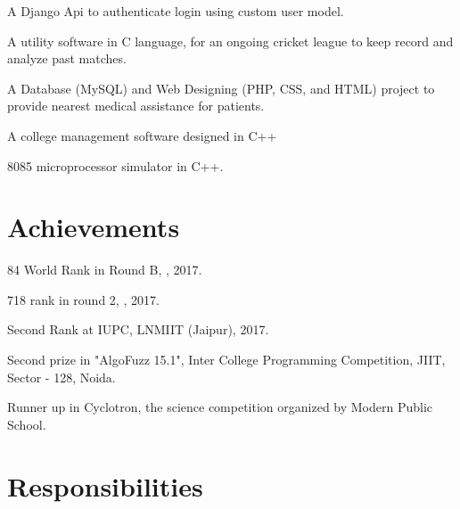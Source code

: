\documentclass[]{hieudo-build}
\begin{document}
\begin{minipage}[t]{0.69\textwidth}
 
\descript{}
A Django Api to authenticate login using custom user model.
\sectionsep 

 
\descript{}
A utility software in C language, for an ongoing cricket league to keep record and analyze past matches.
\sectionsep 

\descript{}
A Database (MySQL) and Web Designing (PHP, CSS, and HTML) project to provide nearest medical assistance for patients.
\sectionsep

\descript{}
A college management software designed in C++%
\sectionsep 

 
\descript{}
8085 microprocessor simulator in C++.
\sectionsep 



\section{Achievements}

\vspace{0.5em} 
\begin{tightemize}

\item 84 World Rank in Round B, , 2017.
\item 718 rank in round 2, , 2017.
\item Second Rank at IUPC, LNMIIT (Jaipur), 2017.
\item Second prize in "AlgoFuzz 15.1", Inter College Programming Competition, JIIT, Sector - 128, Noida.
\item Runner up in Cyclotron, the science competition organized by Modern Public School.
\end{tightemize}
\sectionsep



\section{Responsibilities}


\end{minipage}
\end{document}
